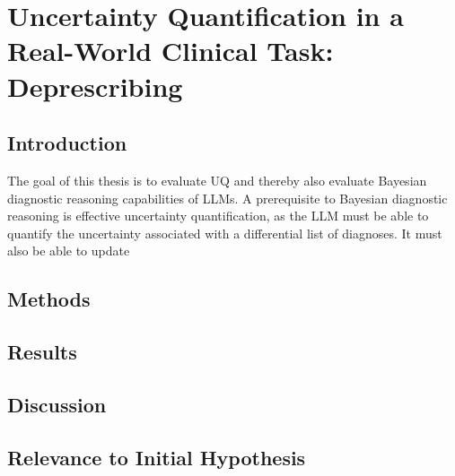 \chapter{Uncertainty Quantification in a Real-World Clinical Task: Deprescribing} \label{chapter:deprescribing}

\section{Introduction}
The goal of this thesis is to evaluate UQ and thereby also evaluate Bayesian diagnostic reasoning capabilities of LLMs. A prerequisite to Bayesian diagnostic reasoning is effective uncertainty quantification, as the LLM must be able to quantify the uncertainty associated with a differential list of diagnoses. It must also be able to update 

\section{Methods}
\section{Results}
\section{Discussion}
\section{Relevance to Initial Hypothesis}
